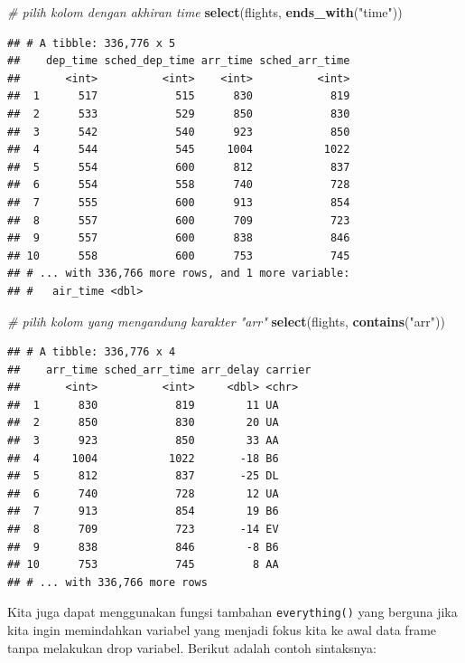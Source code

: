\documentclass[]{book}
\newenvironment{Shaded}{\begin{snugshade}}{\end{snugshade}}
\newcommand{\KeywordTok}[1]{\textcolor[rgb]{0.13,0.29,0.53}{\textbf{#1}}}
\newcommand{\StringTok}[1]{\textcolor[rgb]{0.31,0.60,0.02}{#1}}
\newcommand{\CommentTok}[1]{\textcolor[rgb]{0.56,0.35,0.01}{\textit{#1}}}
\newcommand{\NormalTok}[1]{#1}
\begin{document}
\begin{Shaded}
\begin{Highlighting}[]
\CommentTok{# pilih kolom dengan akhiran time}
\KeywordTok{select}\NormalTok{(flights, }\KeywordTok{ends_with}\NormalTok{(}\StringTok{"time"}\NormalTok{))}
\end{Highlighting}
\end{Shaded}

\begin{verbatim}
## # A tibble: 336,776 x 5
##    dep_time sched_dep_time arr_time sched_arr_time
##       <int>          <int>    <int>          <int>
##  1      517            515      830            819
##  2      533            529      850            830
##  3      542            540      923            850
##  4      544            545     1004           1022
##  5      554            600      812            837
##  6      554            558      740            728
##  7      555            600      913            854
##  8      557            600      709            723
##  9      557            600      838            846
## 10      558            600      753            745
## # ... with 336,766 more rows, and 1 more variable:
## #   air_time <dbl>
\end{verbatim}

\begin{Shaded}
\begin{Highlighting}[]
\CommentTok{# pilih kolom yang mengandung karakter "arr"}
\KeywordTok{select}\NormalTok{(flights, }\KeywordTok{contains}\NormalTok{(}\StringTok{"arr"}\NormalTok{))}
\end{Highlighting}
\end{Shaded}

\begin{verbatim}
## # A tibble: 336,776 x 4
##    arr_time sched_arr_time arr_delay carrier
##       <int>          <int>     <dbl> <chr>  
##  1      830            819        11 UA     
##  2      850            830        20 UA     
##  3      923            850        33 AA     
##  4     1004           1022       -18 B6     
##  5      812            837       -25 DL     
##  6      740            728        12 UA     
##  7      913            854        19 B6     
##  8      709            723       -14 EV     
##  9      838            846        -8 B6     
## 10      753            745         8 AA     
## # ... with 336,766 more rows
\end{verbatim}

Kita juga dapat menggunakan fungsi tambahan \texttt{everything()} yang
berguna jika kita ingin memindahkan variabel yang menjadi fokus kita ke
awal data frame tanpa melakukan drop variabel. Berikut adalah contoh
sintaksnya:
\end{document}
